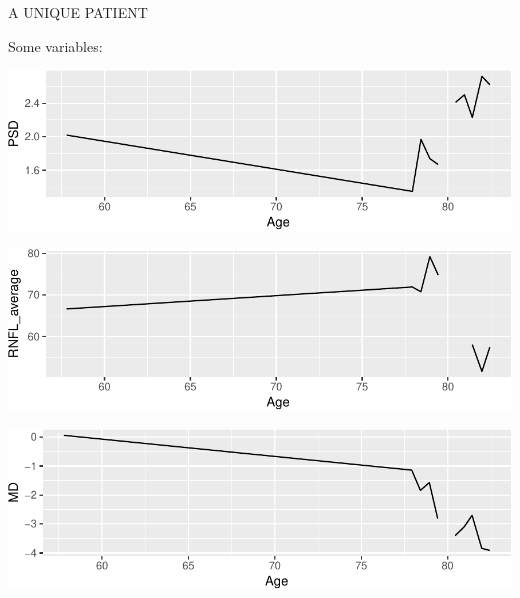 \documentclass[ignorenonframetext,]{beamer}
\begin{document}
\begin{frame}{A UNIQUE PATIENT}

Some variables:

\includegraphics{analisi_exp_markdown_files/figure-beamer/unnamed-chunk-8-1.pdf}

\includegraphics{analisi_exp_markdown_files/figure-beamer/unnamed-chunk-9-1.pdf}

\includegraphics{analisi_exp_markdown_files/figure-beamer/unnamed-chunk-10-1.pdf}

\end{frame}
\end{document}
